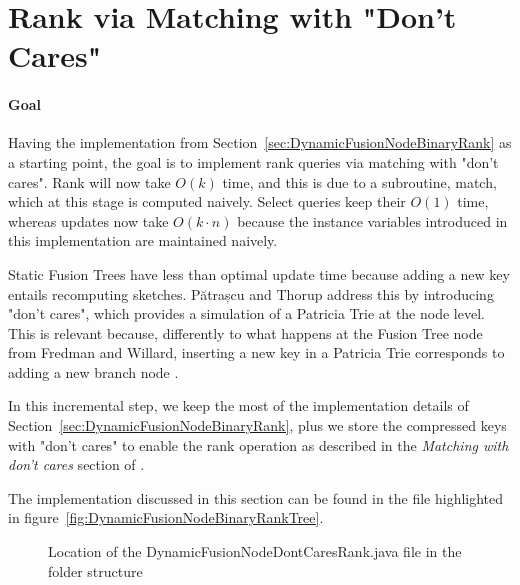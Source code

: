 \newpage
\section{Rank via Matching with "Don't Cares"} \label{sec:rankWithDontCares}

\paragraph*{Goal}
Having the implementation from Section~\ref{sec:DynamicFusionNodeBinaryRank} as a starting point, the goal is to implement rank queries via matching with "don't cares". Rank will now take $O(k)$ time, and this is due to a subroutine, {\ttfamily match}, which at this stage is computed naively. Select queries keep their $O(1)$ time, whereas updates now take $O(k\cdot n)$ because the instance variables introduced in this implementation are maintained naively.

Static Fusion Trees have less than optimal update time because adding a new key entails recomputing sketches. Pătrașcu and Thorup address this by introducing "don't cares", which provides a simulation of a Patricia Trie at the node level. This is relevant because, differently to what happens at the Fusion Tree node from Fredman and Willard, inserting a new key in a Patricia Trie corresponds to adding a new branch node \cite{patrascu2014dynamic}.

In this incremental step, we keep the most of the implementation details of Section~\ref{sec:DynamicFusionNodeBinaryRank}, plus we store the compressed keys with "don't cares" to enable the rank operation as described in the \textit{Matching with don't cares} section of \cite{patrascu2014dynamic}.

The implementation discussed in this section can be found in the file highlighted in figure~\ref{fig:DynamicFusionNodeBinaryRankTree}.
\begin{figure}[H]
\caption{Location of the {\ttfamily DynamicFusionNodeDontCaresRank.java} file in the folder structure}
\label{fig:DynamicFusionNodeDontCaresRankTree}
\end{figure}

